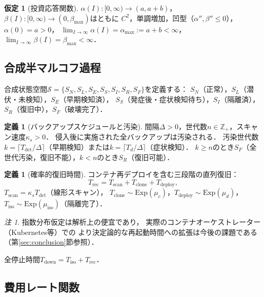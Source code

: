 \documentclass[12pt,a4paper]{article}
\theoremstyle{plain}
\theoremstyle{definition}
\newtheorem{definition}[theorem]{定義}
\newtheorem{assumption}[theorem]{仮定}
\theoremstyle{remark}
\newtheorem{remark}[theorem]{注}
\newcommand{\Z}{\mathbb{Z}}
\newcommand{\Tdet}{T_{\mathrm{det}}}
\newcommand{\Trec}{T_{\mathrm{rec}}}
\newcommand{\Tdown}{T_{\mathrm{down}}}
\newcommand{\betaI}{\beta(I)}
\newcommand{\alphI}{\alpha(I)}
\begin{document}
\begin{assumption}[投資応答関数]\label{ass:alpha}
$\alphI:[0,\infty)\to(a,a+b)$，$\betaI:[0,\infty)\to(0,\beta_{\max})$はともに
$C^2$，単調増加，凹型（$\alpha'',\beta''\le0$），$\alpha(0)=a>0$，
$\lim_{I\to\infty}\alphI=\alpha_{\max}:=a+b<\infty$，
$\lim_{I\to\infty}\betaI=\beta_{\max}<\infty$．
\end{assumption}

\subsection{合成半マルコフ過程}

合成状態空間$\mathcal{S}=\{S_N,S_L,S_E,S_S,S_I,S_R,S_F\}$を定義する：
$S_N$（正常），$S_L$（潜伏・未検知），$S_E$（早期検知済），
$S_S$（発症後・症状検知待ち），$S_I$（隔離済），$S_R$（復旧中），$S_F$（破壊完了）．

\begin{definition}[バックアップスケジュールと汚染]
間隔$\Delta>0$，世代数$n\in\Z_+$，スキャン速度$\kappa_s>0$．
侵入後に実施された全バックアップは汚染される．
汚染世代数$k=\lceil\Tdet/\Delta\rceil$（早期検知）または$k=\lceil T_d/\Delta\rceil$（症状検知）．
$k\ge n$のとき$S_F$（全世代汚染，復旧不能），$k<n$のとき$S_R$（復旧可能）．
\end{definition}

\begin{definition}[確率的復旧時間]\label{def:recovery}
コンテナ再デプロイを含む三段階の直列復旧：
\begin{equation}\label{eq:recovery}
\Trec = T_{\mathrm{scan}} + T_{\mathrm{clone}} + T_{\mathrm{deploy}},
\end{equation}
$T_{\mathrm{scan}}=\kappa_s\Tdet$（線形スキャン），
$T_{\mathrm{clone}}\sim\mathrm{Exp}(\mu_c)$，$T_{\mathrm{deploy}}\sim\mathrm{Exp}(\mu_d)$，
$T_{\mathrm{iso}}\sim\mathrm{Exp}(\mu_{\mathrm{iso}})$（隔離完了）．

\begin{remark}
指数分布仮定は解析上の便宜であり，
実際のコンテナオーケストレーター（Kubernetes等）での
より決定論的な再起動時間への拡張は今後の課題である
（第\ref{sec:conclusion}節参照）．
\end{remark}

全停止時間$\Tdown=T_{\mathrm{iso}}+\Trec$．
\end{definition}

\subsection{費用レート関数}
\end{document}
